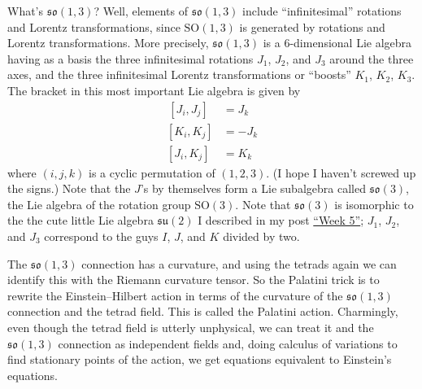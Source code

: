 \documentclass[12pt]{article}
\begin{document}
What's \(\mathfrak{so}(1,3)\)? Well, elements of \(\mathfrak{so}(1,3)\)
include ``infinitesimal'' rotations and Lorentz transformations, since
\(\mathrm{SO}(1,3)\) is generated by rotations and Lorentz
transformations. More precisely, \(\mathfrak{so}(1,3)\) is a
6-dimensional Lie algebra having as a basis the three infinitesimal
rotations \(J_1\), \(J_2\), and \(J_3\) around the three axes, and the
three infinitesimal Lorentz transformations or ``boosts'' \(K_1\),
\(K_2\), \(K_3\). The bracket in this most important Lie algebra is
given by
\[\begin{aligned}\,[J_i,J_j] & = J_k \\ [K_i,K_j] &= -J_k \\ [J_i,K_j] &= K_k\end{aligned}\]
where \((i,j,k)\) is a cyclic permutation of \((1,2,3)\). (I hope I
haven't screwed up the signs.) Note that the \(J\)'s by themselves form
a Lie subalgebra called \(\mathfrak{so}(3)\), the Lie algebra of the
rotation group \(\mathrm{SO}(3)\). Note that \(\mathfrak{so}(3)\) is
isomorphic to the the cute little Lie algebra \(\mathfrak{su}(2)\) I
described in my post \protect\hyperlink{week5}{``Week 5''}; \(J_1\),
\(J_2\), and \(J_3\) correspond to the guys \(I\), \(J\), and \(K\)
divided by two.

The \(\mathfrak{so}(1,3)\) connection has a curvature, and using the
tetrads again we can identify this with the Riemann curvature tensor. So
the Palatini trick is to rewrite the Einstein--Hilbert action in terms of
the curvature of the \(\mathfrak{so}(1,3)\) connection and the tetrad
field. This is called the Palatini action. Charmingly, even though the
tetrad field is utterly unphysical, we can treat it and the
\(\mathfrak{so}(1,3)\) connection as independent fields and, doing
calculus of variations to find stationary points of the action, we get
equations equivalent to Einstein's equations.
\end{document}
